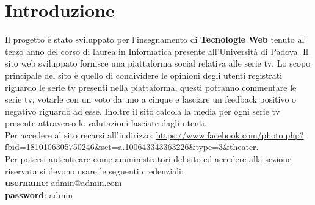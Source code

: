 \newpage
\section{Introduzione}
Il progetto è stato sviluppato per l'insegnamento di \textbf{\normalsize{Tecnologie Web}} tenuto al terzo anno del corso di laurea in Informatica presente all'Università di Padova. Il sito web sviluppato fornisce una piattaforma social relativa alle serie tv. Lo scopo principale del sito è quello di condividere le opinioni degli utenti registrati riguardo le serie tv presenti nella piattaforma, questi potranno commentare le serie tv, votarle con un voto da uno a cinque e lasciare un feedback positivo o negativo riguardo ad esse. Inoltre il sito calcola la media per ogni serie tv presente attraverso le valutazioni lasciate dagli utenti.~\\

Per accedere al sito recarsi all'indirizzo: \url{https://www.facebook.com/photo.php?fbid=1810106305750246&set=a.100643343363226&type=3&theater}.~\\

Per potersi autenticare come amministratori del sito ed accedere 
alla sezione riservata si devono usare le seguenti credenziali: \\
\enspace \textbf{username}: admin@admin.com \\ 
\enspace \textbf{password}: admin \\